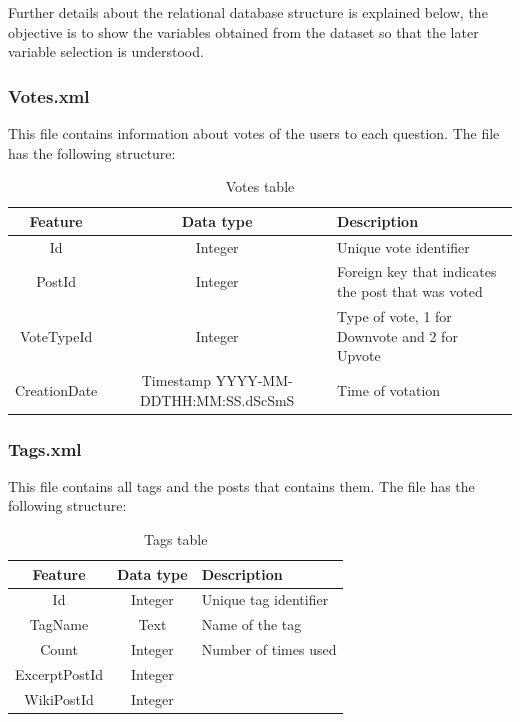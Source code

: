 \documentclass[11pt]{article} %
\begin{document}
    Further details about the relational database structure is explained below, the objective is to show the variables obtained from the dataset so that the later variable selection is understood.

    \subsubsection{Votes.xml}

      This file contains information about votes of the users to each question. The file has the following structure:

      \begin{table}[!h]
        \centering
        \begin{tabular}{|c|c|p{}|}
          \hline
          Feature & Data type & Description \\ \hline
          Id & Integer & Unique vote identifier \\ \hline
          PostId & Integer & Foreign key that indicates the post that was voted \\ \hline
          VoteTypeId & Integer & Type of vote, 1 for Downvote and 2 for Upvote \\ \hline
          CreationDate & Timestamp YYYY-MM-DDTHH:MM:SS.dScSmS & Time of votation \\ \hline
        \end{tabular}
        \caption{Votes table}
        \label{tab:votes}
      \end{table}

    \subsubsection{Tags.xml}

      This file contains all tags and the posts that contains them. The file has the following structure:

      \begin{table}[!h]
        \centering
        \begin{tabular}{|c|c|p{}|}
          \hline

          Feature & Data type & Description \\ \hline
          Id & Integer & Unique tag identifier \\ \hline
          TagName & Text & Name of the tag \\ \hline
          Count & Integer & Number of times used \\ \hline
          ExcerptPostId & Integer & \\ \hline
          WikiPostId & Integer & \\

          \hline
        \end{tabular}
        \caption{Tags table}
        \label{tab:tags}
      \end{table}
\newpage
\end{document}

